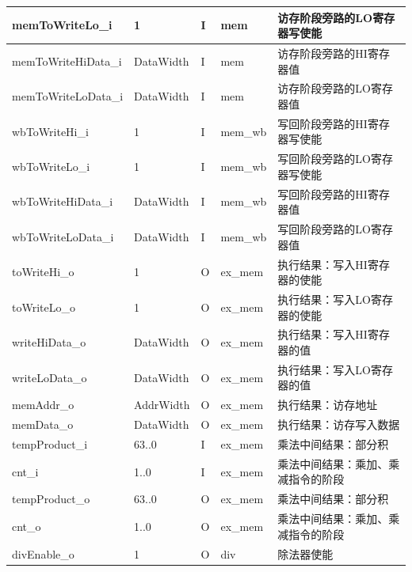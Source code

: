 \documentclass{article}
\begin{document}
\begin{spacing}{1.4}
\begin{longtable}{l|l|l|l|p{5cm}}
\hline memToWriteLo\_i         & 1                      & I     & mem           & 访存阶段旁路的LO寄存器写使能 \\
\hline memToWriteHiData\_i     & DataWidth              & I     & mem           & 访存阶段旁路的HI寄存器值 \\
\hline memToWriteLoData\_i     & DataWidth              & I     & mem           & 访存阶段旁路的LO寄存器值 \\
\hline wbToWriteHi\_i          & 1                      & I     & mem\_wb       & 写回阶段旁路的HI寄存器写使能 \\
\hline wbToWriteLo\_i          & 1                      & I     & mem\_wb       & 写回阶段旁路的LO寄存器写使能 \\
\hline wbToWriteHiData\_i      & DataWidth              & I     & mem\_wb       & 写回阶段旁路的HI寄存器值 \\
\hline wbToWriteLoData\_i      & DataWidth              & I     & mem\_wb       & 写回阶段旁路的LO寄存器值 \\
\hline toWriteHi\_o            & 1                      & O     & ex\_mem       & 执行结果：写入HI寄存器的使能 \\
\hline toWriteLo\_o            & 1                      & O     & ex\_mem       & 执行结果：写入LO寄存器的使能 \\
\hline writeHiData\_o          & DataWidth              & O     & ex\_mem       & 执行结果：写入HI寄存器的值 \\
\hline writeLoData\_o          & DataWidth              & O     & ex\_mem       & 执行结果：写入LO寄存器的值 \\
\hline memAddr\_o              & AddrWidth              & O     & ex\_mem       & 执行结果：访存地址 \\
\hline memData\_o              & DataWidth              & O     & ex\_mem       & 执行结果：访存写入数据 \\
\hline tempProduct\_i          & 63..0                  & I     & ex\_mem       & 乘法中间结果：部分积 \\
\hline cnt\_i                  & 1..0                   & I     & ex\_mem       & 乘法中间结果：乘加、乘减指令的阶段 \\
\hline tempProduct\_o          & 63..0                  & O     & ex\_mem       & 乘法中间结果：部分积 \\
\hline cnt\_o                  & 1..0                   & O     & ex\_mem       & 乘法中间结果：乘加、乘减指令的阶段 \\
\hline divEnable\_o            & 1                      & O     & div           & 除法器使能 \\

\end{longtable}
\end{spacing}
\end{document}
